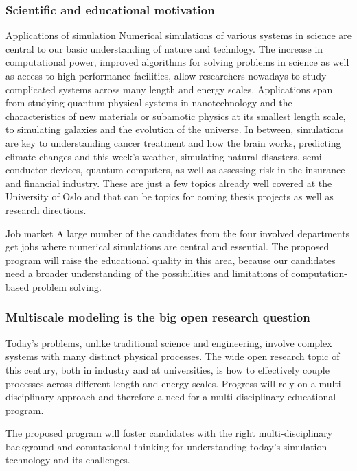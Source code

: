 \documentclass{beamer}
\begin{document}
\begin{frame}
\frametitle{Scientific and educational motivation}

\begin{block}{Applications of simulation }
Numerical simulations of various systems in science are central to our
basic understanding of nature and technlogy.
The increase in computational power,
improved algorithms for solving problems in science as well as access
to high-performance facilities, allow researchers nowadays to study
complicated systems across many length and energy scales. Applications
span from studying quantum physical systems in nanotechnology and the
characteristics of new materials or subamotic physics at its smallest
length scale, to simulating galaxies and the evolution of the universe.
In between, simulations are key to understanding
cancer treatment and how the brain works,
predicting climate changes and this week's weather,
simulating natural disasters, semi-conductor devices,
quantum computers, as well as assessing risk in the insurance and
financial industry. These are just a few topics
already well covered at the University of Oslo and that can be
topics for coming thesis projects as well as research directions.
\end{block}

\begin{block}{Job market }
A large number of the candidates from the four involved departments
get jobs where numerical simulations are central and essential. The proposed
program will raise the educational quality in this area, because
our candidates need a broader understanding of the possibilities
and limitations of computation-based problem solving.
\end{block}
\end{frame}

\begin{frame}
\frametitle{Multiscale modeling is the big open research question}

\begin{block}{}
Today's problems, unlike traditional
science and engineering, involve complex systems with many distinct
physical processes. The wide open research topic of this century, both
in industry and at universities, is how to effectively couple
processes across different length and energy scales. Progress will
rely on a multi-disciplinary approach and therefore a need for
a multi-disciplinary educational program.
\end{block}

\begin{block}{}
The proposed program will foster candidates with the right
multi-disciplinary background and comutational thinking for
understanding today's simulation technology and its challenges.
\end{block}
\end{frame}
\end{document}
